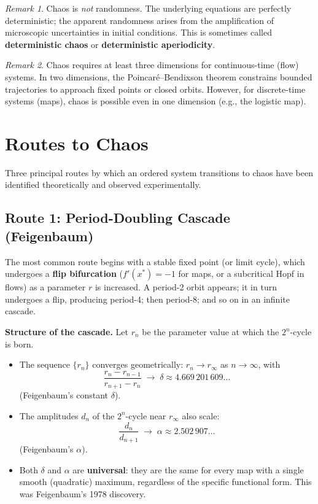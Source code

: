 \documentclass[11pt,letterpaper]{article}
\theoremstyle{definition}
\theoremstyle{plain}
\theoremstyle{remark}
\newtheorem{remark}{Remark}[section]
\newcommand{\xstar}{x^*}
\begin{document}
\begin{remark}
Chaos is \emph{not} randomness.  The underlying equations are perfectly
deterministic; the apparent randomness arises from the amplification of
microscopic uncertainties in initial conditions.  This is sometimes called
\textbf{deterministic chaos} or \textbf{deterministic aperiodicity}.
\end{remark}

\begin{remark}
Chaos requires at least three dimensions for continuous-time (flow) systems.
In two dimensions, the Poincar\'e--Bendixson theorem constrains bounded
trajectories to approach fixed points or closed orbits.  However, for
discrete-time systems (maps), chaos is possible even in one dimension
(e.g., the logistic map).
\end{remark}

\section{Routes to Chaos}\label{sec:routes-chaos}

Three principal routes by which an ordered system transitions to chaos
have been identified theoretically and observed experimentally.

\subsection{Route 1: Period-Doubling Cascade (Feigenbaum)}

The most common route begins with a stable fixed point (or limit cycle),
which undergoes a \textbf{flip bifurcation} ($f'(\xstar)=-1$ for maps,
or a subcritical Hopf in flows) as a parameter $r$ is increased.  A
period-2 orbit appears; it in turn undergoes a flip, producing period-4;
then period-8; and so on in an infinite cascade.

\textbf{Structure of the cascade.}
Let $r_n$ be the parameter value at which the $2^n$-cycle is born.
\begin{itemize}[leftmargin=2em]
  \item The sequence $\{r_n\}$ converges geometrically:
    $r_n \to r_\infty$ as $n\to\infty$, with
    \begin{equation}\label{eq:feig-delta}
      \frac{r_n - r_{n-1}}{r_{n+1}-r_n} \;\longrightarrow\;
      \delta \approx 4.669\,201\,609\ldots
    \end{equation}
    (Feigenbaum's constant $\delta$).
  \item The amplitudes $d_n$ of the $2^n$-cycle near $r_\infty$ also
    scale:
    \begin{equation}
      \frac{d_n}{d_{n+1}} \;\longrightarrow\; \alpha \approx 2.502\,907\ldots
    \end{equation}
    (Feigenbaum's $\alpha$).
  \item Both $\delta$ and $\alpha$ are \textbf{universal}: they are the
    same for every map with a single smooth (quadratic) maximum,
    regardless of the specific functional form.  This was Feigenbaum's
    1978 discovery.
\end{itemize}
\end{document}
